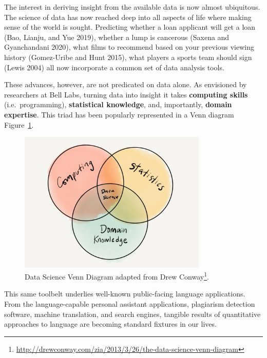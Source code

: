 \documentclass[
  letterpaper,
]{scrbook}
\DeclareRobustCommand{\href}[2]{#2\footnote{\url{#1}}}
\begin{document}
The interest in deriving insight from the available data is now almost
ubiquitous. The science of data has now reached deep into all aspects of
life where making sense of the world is sought. Predicting whether a
loan applicant will get a loan (Bao, Lianju, and Yue 2019), whether a
lump is cancerous (Saxena and Gyanchandani 2020), what films to
recommend based on your previous viewing history (Gomez-Uribe and Hunt
2015), what players a sports team should sign (Lewis 2004) all now
incorporate a common set of data analysis tools.

These advances, however, are not predicated on data alone. As envisioned
by researchers at Bell Labs, turning data into insight it takes
\textbf{computing skills} (i.e.~programming), \textbf{statistical
knowledge}, and, importantly, \textbf{domain expertise}. This triad has
been popularly represented in a Venn diagram
Figure~\ref{fig-intro-data-science-venn}.

\begin{figure}[h]

{\centering \includegraphics[width=0.8\textwidth,height=\textheight]{./figures/text-analysis/data-science-venn-paper.png}

}

\caption{\label{fig-intro-data-science-venn}Data Science Venn Diagram
adapted from
\href{http://drewconway.com/zia/2013/3/26/the-data-science-venn-diagram}{Drew
Conway}.}

\end{figure}

This same toolbelt underlies well-known public-facing language
applications. From the language-capable personal assistant applications,
plagiarism detection software, machine translation, and search engines,
tangible results of quantitative approaches to language are becoming
standard fixtures in our lives.
\end{document}
